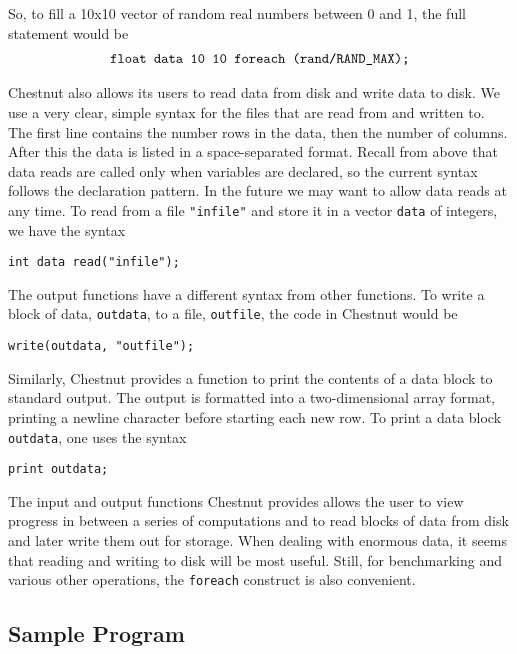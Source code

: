 \documentclass[twocolumn]{article}
\renewcommand{\|}{\origbar} %
\newcommand{\code}[1]{\texttt{#1}}
\begin{document}
So, to fill a 10x10 vector of random real numbers between 0 and 1, the full statement would be
\begin{align*}
  \if@twocolumn
    \code{float } &\code{data 10 10 } \\ &\code{foreach (rand/RAND\_MAX);}
  \else
    \code{float data 10 10 foreach (rand/RAND\_MAX);}
  \fi
\end{align*}

Chestnut also allows its users to read data from disk and write data to disk. We use a very clear, simple syntax for the files that are read from and written to. The first line contains the number rows in the data, then the number of columns. After this the data is listed in a space-separated format. Recall from above that data reads are called only when variables are declared, so the current syntax follows the declaration pattern. In the future we may want to allow data reads at any time. To read from a file \code{"infile"} and store it in a vector \code{data} of integers, we have the syntax
\begin{center}
  \code{int data read("infile");}
\end{center}

The output functions have a different syntax from other functions. To write a block of data, \code{outdata}, to a file, \code{outfile}, the code in Chestnut would be
\begin{center}
  \code{write(outdata, "outfile");}
\end{center}

Similarly, Chestnut provides a function to print the contents of a data block to standard output. The output is formatted into a two-dimensional array format, printing a newline character before starting each new row. To print a data block \code{outdata}, one uses the syntax
\begin{center}
  \code{print outdata;}
\end{center}

The input and output functions Chestnut provides allows the user to view progress in between a series of computations and to read blocks of data from disk and later write them out for storage. When dealing with enormous data, it seems that reading and writing to disk will be most useful. Still, for benchmarking and various other operations, the \code{foreach} construct is also convenient.

\subsection{Sample Program}
\end{document}
